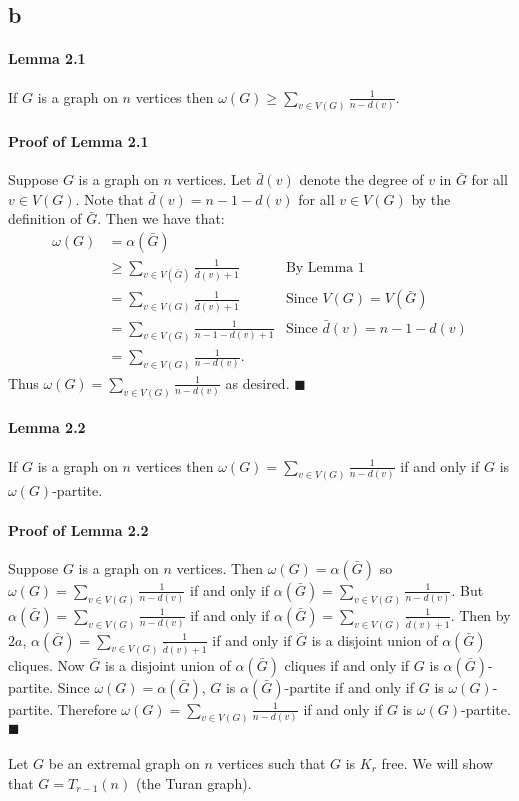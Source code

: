 \documentclass[letterpaper,12pt,oneside,onecolumn]{article}
\begin{document}
\subsection*{b}
\paragraph{Lemma 2.1}
If $G$ is a graph on $n$ vertices then $\omega(G) \geq \sum_{v \in V(G)} \frac{1}{n-d(v)}$.
\paragraph{Proof of Lemma 2.1}
Suppose $G$ is a graph on $n$ vertices. Let $\bar{d}(v)$ denote the degree of $v$ in $\bar{G}$ for all $v \in V(G)$. Note that $\bar{d}(v) = n-1-d(v)$ for all $v \in V(G)$ by the definition of $\bar{G}$. Then we have that:
\begin{align*}
\omega(G) &= \alpha(\bar{G}) \\
&\geq \sum_{v \in V(\bar{G})} \frac{1}{\bar{d}(v) + 1} &\text{By Lemma $1$}\\
&= \sum_{v \in V(G)} \frac{1}{\bar{d}(v) + 1} &\text{Since $V(G) = V(\bar{G})$}\\
&= \sum_{v \in V(G)} \frac{1}{n - 1 - d(v) + 1} &\text{Since $\bar{d}(v) = n-1-d(v)$}\\
&=\sum_{v \in V(G)} \frac{1}{n-d(v)}.
\end{align*}
Thus $\omega(G) = \sum_{v \in V(G)} \frac{1}{n-d(v)}$ as desired. $\blacksquare$
\paragraph{Lemma 2.2}
If $G$ is a graph on $n$ vertices then $\omega(G) = \sum_{v \in V(G)} \frac{1}{n-d(v)}$ if and only if $G$ is $\omega(G)$-partite.
\paragraph{Proof of Lemma 2.2}
Suppose $G$ is a graph on $n$ vertices. Then $\omega(G) = \alpha(\bar{G})$ so $\omega(G) = \sum_{v \in V(G)} \frac{1}{n-d(v)}$ if and only if $\alpha(\bar{G}) = \sum_{v \in V(G)} \frac{1}{n-d(v)}$. But $\alpha(\bar{G}) = \sum_{v \in V(G)} \frac{1}{n-d(v)}$ if and only if $\alpha(\bar{G}) = \sum_{v \in V(G)} \frac{1}{\bar{d}(v) + 1}$. Then by $2a$, $\alpha(\bar{G}) = \sum_{v \in V(G)} \frac{1}{\bar{d}(v) + 1}$  if and only if $\bar{G}$ is a disjoint union of $\alpha(\bar{G})$ cliques. Now $\bar{G}$ is a disjoint union of $\alpha(\bar{G})$ cliques if and only if $G$ is $\alpha(\bar{G})$-partite. Since $\omega(G) = \alpha(\bar{G})$, $G$ is $\alpha(\bar{G})$-partite if and only if $G$ is $\omega(G)$-partite. Therefore $\omega(G) = \sum_{v \in V(G)} \frac{1}{n-d(v)}$ if and only if $G$ is $\omega(G)$-partite. $\blacksquare$
\paragraph{}
Let $G$ be an extremal graph on $n$ vertices such that $G$ is $K_r$ free. We will show that $G = T_{r-1}(n)$ (the Turan graph).
\end{document}
